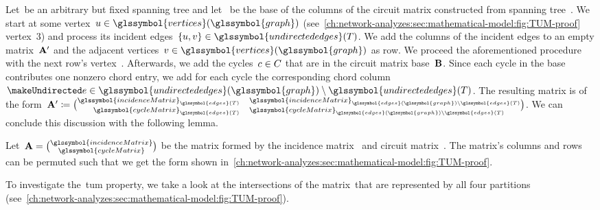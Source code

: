 Let~\tree be an arbitrary but fixed spanning tree and
let~ be the base of the columns of the circuit matrix
constructed from spanning tree~\tree. We start at some
vertex~$\vertexa\in\glssymbol{vertices}(\glssymbol{graph})$
(see~\cref{ch:network-analyzes:sec:mathematical-model:fig:TUM-proof}
vertex~$3$) and process its incident edges~$
    \{\vertexa,\vertexb\}
    \in
    \glssymbol{undirectededges}(\tree)
$. We add the columns of the incident edges to an empty
matrix~$\mathbf{A}'$ and the adjacent vertices~$
    \vertexb
    \in
    \glssymbol{vertices}(\glssymbol{graph})
$ as row. We proceed the aforementioned procedure with the next row's
vertex~\vertexb. Afterwards, we add the cycles~$c\in C$ that are in
the circuit matrix base~$\mathbf{B}$. Since each cycle in the base contributes
one nonzero chord entry, we add for each cycle the corresponding chord column~$
    \undirectededge
    \in
    \glssymbol{undirectededges}(\glssymbol{graph})
    \setminus
    \glssymbol{undirectededges}(\tree)
$. The resulting matrix is of the form~$
    \constraintmatrix'%
    \coloneqq%
    \binom{%
        \glssymbol{incidenceMatrix}_{%
            \glssymbol{edges}(\tree)%
        }\quad\glssymbol{incidenceMatrix}_{%
            \glssymbol{edges}(\glssymbol{graph})%
            \setminus%
            \glssymbol{edges}(\tree)%
        }%
    }{%
        \glssymbol{cycleMatrix}_{%
            \glssymbol{edges}(\tree)%
        }\quad\glssymbol{cycleMatrix}_{%
            \glssymbol{edges}(\glssymbol{graph})%
            \setminus%
            \glssymbol{edges}(\tree)%
        }%
    }
$. We can conclude this discussion with the following lemma.
% 
\begin{lemma}
    Let~$
        \constraintmatrix 
        = 
        \binom{
            \glssymbol{incidenceMatrix}
        }{  
            \glssymbol{cycleMatrix}
        }
    $ be the matrix formed by the incidence matrix~
    and circuit matrix~. The matrix's columns and rows
    can be permuted such that we get the form shown
    in~\cref{ch:network-analyzes:sec:mathematical-model:fig:TUM-proof}.
\end{lemma}
% 
To investigate the~\gls{tum} property, we take a look at the intersections of
the matrix~\constraintmatrix that are represented by all four partitions
(see~\cref{ch:network-analyzes:sec:mathematical-model:fig:TUM-proof}).

